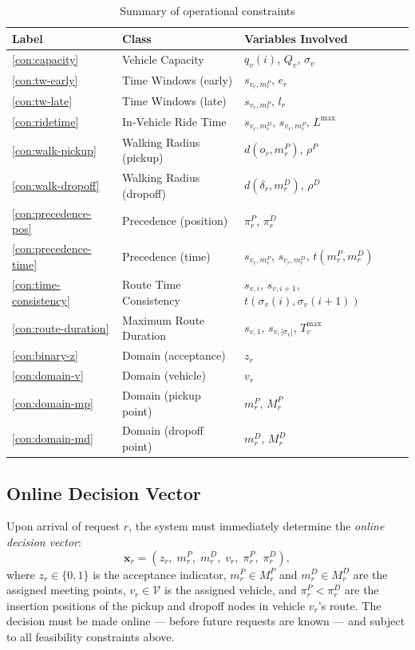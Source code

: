 \begin{table}[h]
\centering
\caption{Summary of operational constraints}
\label{tab:constraints}
\begin{tabular}{lll}
\toprule
\textbf{Label} & \textbf{Class} & \textbf{Variables Involved} \\
\midrule
\ref{con:capacity}         & Vehicle Capacity            & $q_v(i)$, $Q_v$, $\sigma_v$ \\
\ref{con:tw-early}         & Time Windows (early)        & $s_{v_r, m_r^P}$, $e_r$ \\
\ref{con:tw-late}          & Time Windows (late)         & $s_{v_r, m_r^P}$, $l_r$ \\
\ref{con:ridetime}         & In-Vehicle Ride Time        & $s_{v_r, m_r^D}$, $s_{v_r, m_r^P}$, $L^{\max}$ \\
\ref{con:walk-pickup}      & Walking Radius (pickup)     & $d(o_r, m_r^P)$, $\rho^P$ \\
\ref{con:walk-dropoff}     & Walking Radius (dropoff)    & $d(\delta_r, m_r^D)$, $\rho^D$ \\
\ref{con:precedence-pos}   & Precedence (position)       & $\pi_r^P$, $\pi_r^D$ \\
\ref{con:precedence-time}  & Precedence (time)           & $s_{v_r, m_r^P}$, $s_{v_r, m_r^D}$, $t(m_r^P, m_r^D)$ \\
\ref{con:time-consistency} & Route Time Consistency      & $s_{v,i}$, $s_{v,i+1}$, $t(\sigma_v(i), \sigma_v(i+1))$ \\
\ref{con:route-duration}   & Maximum Route Duration      & $s_{v,1}$, $s_{v,|\sigma_v|}$, $T_v^{\max}$ \\
\ref{con:binary-z}         & Domain (acceptance)         & $z_r$ \\
\ref{con:domain-v}         & Domain (vehicle)            & $v_r$ \\
\ref{con:domain-mp}        & Domain (pickup point)       & $m_r^P$, $M_r^P$ \\
\ref{con:domain-md}        & Domain (dropoff point)      & $m_r^D$, $M_r^D$ \\
\bottomrule
\end{tabular}
\end{table}

\subsection{Online Decision Vector}

Upon arrival of request $r$, the system must immediately determine the \emph{online decision
vector}:
\begin{equation}\label{eq:decvec}
  \mathbf{x}_r = (z_r,\; m_r^P,\; m_r^D,\; v_r,\; \pi_r^P,\; \pi_r^D),
\end{equation}
where $z_r \in \{0,1\}$ is the acceptance indicator, $m_r^P \in M_r^P$ and
$m_r^D \in M_r^D$ are the assigned meeting points, $v_r \in \mathcal{V}$ is the assigned
vehicle, and $\pi_r^P < \pi_r^D$ are the insertion positions of the pickup and dropoff
nodes in vehicle $v_r$'s route. The decision must be made online --- before future requests
are known --- and subject to all feasibility constraints above.

